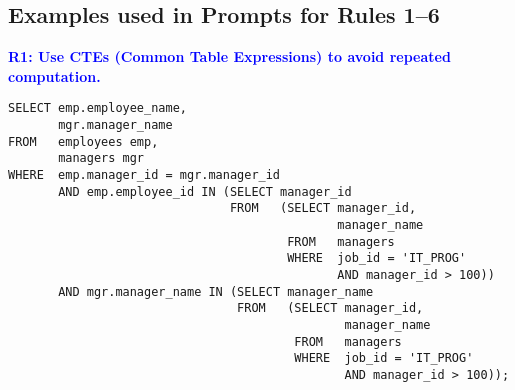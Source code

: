 \newpage

\begin{flushleft}
\section{Examples used in Prompts for Rules 1--6}
\label{app:rules-ex}

\vspace{0.1in}
\noindent \textcolor{blue}{\large \textbf{R1: Use CTEs (Common Table Expressions) to avoid repeated computation.}}







\vspace{0.2in}

        \begin{verbatim}
SELECT emp.employee_name,
       mgr.manager_name
FROM   employees emp,
       managers mgr
WHERE  emp.manager_id = mgr.manager_id
       AND emp.employee_id IN (SELECT manager_id
                               FROM   (SELECT manager_id,
                                              manager_name
                                       FROM   managers
                                       WHERE  job_id = 'IT_PROG'
                                              AND manager_id > 100))
       AND mgr.manager_name IN (SELECT manager_name
                                FROM   (SELECT manager_id,
                                               manager_name
                                        FROM   managers
                                        WHERE  job_id = 'IT_PROG'
                                               AND manager_id > 100)); 
\end{verbatim}


\end{flushleft}
